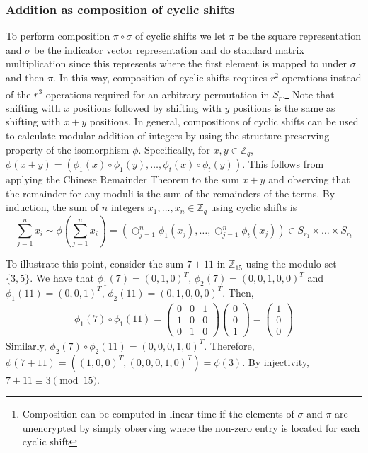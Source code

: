 \subsubsection*{Addition as composition of cyclic shifts}\label{sec:composition_addition}
To perform composition $\pi \circ \sigma$ of cyclic shifts we let $\pi$ be the square representation and $\sigma$ be the indicator vector representation and do standard matrix multiplication since this represents where the first element is mapped to under $\sigma$ and then $\pi$. In this way, composition of cyclic shifts requires $r^2$ operations instead of the $r^3$ operations required for an arbitrary permutation in $S_r$.\footnote{Composition can be computed in linear time if the elements of $\sigma$ and $\pi$ are unencrypted by simply observing where the non-zero entry is located for each cyclic shift} Note that shifting with $x$ positions followed by shifting with $y$ positions is the same as shifting with $x+y$ positions. In general, compositions of cyclic shifts can be used to calculate modular addition of integers by using the structure preserving property of the isomorphism $\phi$. Specifically, for $x,y \in \mathbb{Z}_q$, $\phi(x + y) = (\phi_1(x) \circ \phi_1(y), \dots, \phi_t(x) \circ \phi_t(y))$. This follows from applying the Chinese Remainder Theorem to the sum $x+y$ and observing that the remainder for any moduli is the sum of the remainders of the terms. By induction, the sum of $n$ integers $x_1, \dots, x_n \in \mathbb{Z}_q$ using cyclic shifts is
\begin{equation}\label{cyclic-sum}
    \sum_{j=1}^{n} x_i \sim \phi(\sum_{j=1}^{n} x_i) = (\bigcirc_{j=1}^n \phi_1(x_j), \dots, \bigcirc_{j=1}^n \phi_t(x_j)) \in S_{r_1} \times \dots \times S_{r_t}
\end{equation}

To illustrate this point, consider the sum $7 + 11$ in $\mathbb{Z}_{15}$ using the modulo set $\{3,5\}$. We have that $\phi_1(7) = (0,1,0)^T$, $\phi_2(7) = (0,0,1,0,0)^T$ and $\phi_1(11) = (0,0,1)^T$, $\phi_2(11) = (0,1,0,0,0)^T$. Then, 
\begin{equation*}
    \begin{aligned}
        \phi_1(7) \circ \phi_1(11) = \begin{pmatrix}
            0 & 0 & 1 \\
            1 & 0 & 0 \\
            0 & 1 & 0
        \end{pmatrix} \begin{pmatrix}
            0 \\
            0 \\
            1
        \end{pmatrix} = \begin{pmatrix} 
            1 \\
            0 \\
            0
        \end{pmatrix}
    \end{aligned}
\end{equation*}
Similarly, $\phi_2(7) \circ \phi_2(11) = (0,0,0,1,0)^T$. Therefore, $\phi(7 + 11) = ((1,0,0)^T, (0,0,0,1,0)^T) = \phi(3)$. By injectivity, $7 + 11 \equiv 3 \pmod{15}$.

